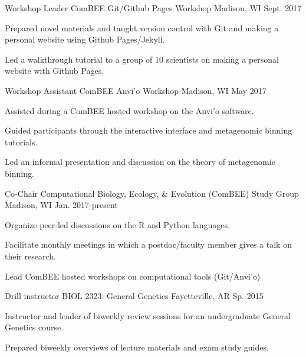 \begin{cventries}
  \cventry
    {Workshop Leader} %
    {ComBEE Git/Github Pages Workshop} %
    {Madison, WI} %
    {Sept. 2017} %
    {
      \begin{cvitems} %
        \item {Prepared novel materials and taught version control with Git and making a personal website using Github Pages/Jekyll.}
        \item {Led a walkthrough tutorial to a group of 10 scientists on making a personal website with Github Pages.}
      \end{cvitems}
    }

  \cventry
    {Workshop Assistant} %
    {ComBEE Anvi'o Workshop} %
    {Madison, WI} %
    {May 2017} %
    {
      \begin{cvitems} %
        \item {Assisted during a ComBEE hosted workshop on the Anvi'o software.}
        \item {Guided participants through the interactive interface and metagenomic binning tutorials.}
        \item {Led an informal presentation and discussion on the theory of metagenomic binning.}
      \end{cvitems}
    }

  \cventry
    {Co-Chair} %
    {Computational Biology, Ecology, \& Evolution (ComBEE) Study Group} %
    {Madison, WI} %
    {Jan. 2017-present} %
    {
      \begin{cvitems} %
        \item {Organize peer-led discussions on the R and Python languages.}
        \item {Facilitate monthly meetings in which a postdoc/faculty member gives a talk on their research.}
        \item {Lead ComBEE hosted workshops on computational tools (Git/Anvi'o)}
      \end{cvitems}
    }

  \cventry
    {Drill instructor} %
    {BIOL 2323: General Genetics} %
    {Fayetteville, AR} %
    {Sp. 2015} %
    {
      \begin{cvitems} %
        \item {Instructor and leader of biweekly review sessions for an undergraduate General Genetics course.}
        \item {Prepared biweekly overviews of lecture materials and exam study guides.}
      \end{cvitems}
    }


\end{cventries}
